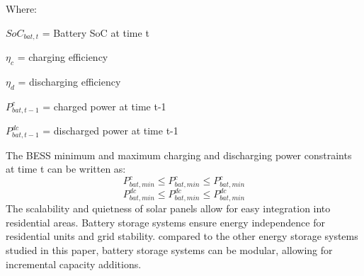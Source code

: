Where:\par
\begin{list}{}{}
	\setlength\itemsep{-1em}
	\item $SoC_{bat,t}$ = Battery SoC at time t
	\item ${\eta_c}$ = charging efficiency
	\item ${\eta_d}$ = discharging efficiency
	\item $P^c_{bat,t-1}$ = charged power at time t-1
	\item ${P^{dc}_{bat,t-1}}$ = discharged power at time t-1
\end{list}
The BESS minimum and maximum charging and discharging power constraints at time t can be written as:
\begin{equation}
	{P^{c}_{bat,min}}\le{P^{c}_{bat,min}}\le{P^{c}_{bat,min}}
\end{equation}
\begin{equation}
	{P^{dc}_{bat,min}}\le{P^{dc}_{bat,min}}\le{P^{dc}_{bat,min}}
\end{equation}
The scalability and quietness of solar panels allow for easy integration into residential areas. Battery storage systems ensure energy independence for residential units and grid stability. compared to the other energy storage systems studied in this paper, battery storage systems can be modular, allowing for incremental capacity additions.
